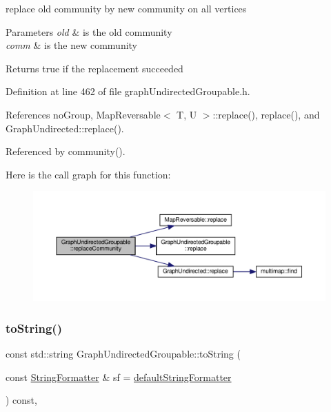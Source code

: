 replace old community by new community on all vertices


\begin{DoxyParams}{Parameters}
{\em old} & is the old community \\
\hline
{\em comm} & is the new community \\
\hline
\end{DoxyParams}
\begin{DoxyReturn}{Returns}
true if the replacement succeeded 
\end{DoxyReturn}


Definition at line 462 of file graph\+Undirected\+Groupable.\+h.



References no\+Group, Map\+Reversable$<$ T, U $>$\+::replace(), replace(), and Graph\+Undirected\+::replace().



Referenced by community().

Here is the call graph for this function\+:
\nopagebreak
\begin{figure}[H]
\begin{center}
\leavevmode
\includegraphics[width=350pt]{classGraphUndirectedGroupable_af29e653d9578b955e47288e075ebf47f_cgraph}
\end{center}
\end{figure}
\mbox{\label{classGraphUndirectedGroupable_a615f30036acfdd33e45b82dc47e7d174}} 
\subsubsection{\texorpdfstring{to\+String()}{toString()}}
{\footnotesize\ttfamily const std\+::string Graph\+Undirected\+Groupable\+::to\+String (\begin{DoxyParamCaption}\item[{const \hyperlink{classStringFormatter}{String\+Formatter} \&}]{sf = {\ttfamily \hyperlink{stringFormatter_8h_abf1349c8e24162d0134072aff288f2a2}{default\+String\+Formatter}} }\end{DoxyParamCaption}) const\hspace{0.3cm}{\ttfamily [inline]}, {\ttfamily [virtual]}}

